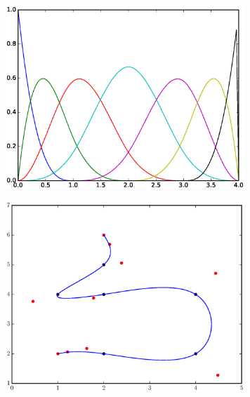 \documentclass[10pt]{article}
\newenvironment{Figure}
  {\par\medskip\noindent\minipage{\linewidth}}
  {\endminipage\par\medskip}
\begin{document}
\begin{multicols}{2}
  \begin{Figure}
    \includegraphics[width=9cm]{../spline_basis.eps}
     \label{fig:basis}
  \end{Figure}
  \begin{Figure}
    \includegraphics[width=9cm]{../s_img/spline8.eps}
     \label{fig:sample}
  \end{Figure}


\end{multicols}
\end{document}
